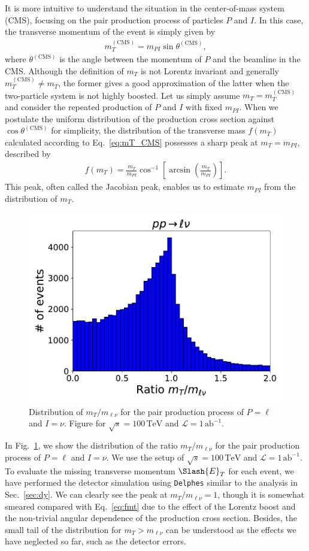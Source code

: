 \documentclass[12pt,twoside,book]{article}
\begin{document}
It is more intuitive to understand the situation in the center-of-mass system (CMS), focusing on the pair production process of particles $P$ and $I$.
In this case, the transverse momentum of the event is simply given by
\begin{align}
  m_T^{\mathrm{(CMS)}} = m_{PI} \sin \theta^{(\mathrm{CMS})},
  \label{eq:mT_CMS}
\end{align}
where $\theta^{(\mathrm{CMS})}$ is the angle between the momentum of $P$ and the beamline in the CMS.
Although the definition of $m_T$ is not Lorentz invariant and generally $m_T^{\mathrm{(CMS)}} \neq m_T$, the former gives a good approximation of the latter when the two-particle system is not highly boosted.
Let us simply assume $m_T = m_T^{\mathrm{(CMS)}}$ and consider the repeated production of $P$ and $I$ with fixed $m_{PI}$.
When we postulate the uniform distribution of the production cross section against $\cos \theta^{(\mathrm{CMS})}$ for simplicity, the distribution of the transverse mass $f(m_T)$ calculated according to Eq.~\eqref{eq:mT_CMS} possesses a sharp peak at $m_T = m_{PI}$, described by
\begin{align}
  f(m_T) =\frac{m_T}{m_{PI}}
  \cos^{-1} \left[ \arcsin \left( \frac{m_T}{m_{PI}} \right) \right].
  \label{eq:fmt}
\end{align}
This peak, often called the Jacobian peak, enables us to estimate $m_{PI}$ from the distribution of $m_T$.

\begin{figure}[t]
  \centering
  \includegraphics[width=0.5\hsize]{invariant_vs_transverse.pdf}
  \caption{
    Distribution of $m_T / m_{\ell \nu}$ for the pair production process of $P=\ell$ and $I=\nu$.
    Figure for $\sqrt{s}=100\,\mathrm{TeV}$ and $\mathcal{L}=1\,\mathrm{ab}^{-1}$.
  }
  \label{fig:invariant_vs_transverse}
\end{figure}

In Fig.~\ref{fig:invariant_vs_transverse}, we show the distribution of the ratio $m_T / m_{\ell \nu}$ for the pair production process of $P=\ell$ and $I=\nu$.
We use the setup of $\sqrt{s}=100\,\mathrm{TeV}$ and $\mathcal{L}=1\,\mathrm{ab}^{-1}$.
To evaluate the missing transverse momentum $\Slash{E}_T$ for each event, we have performed the detector simulation using \texttt{Delphes} similar to the analysis in Sec.~\ref{sec:dy}.
We can clearly see the peak at $m_T / m_{\ell \nu} = 1$, though it is somewhat smeared compared with Eq.~\eqref{eq:fmt} due to the effect of the Lorentz boost and the non-trivial angular dependence of the production cross section.
Besides, the small tail of the distribution for $m_T > m_{\ell \nu}$ can be understood as the effects we have neglected so far, such as the detector errors.
\end{document}
